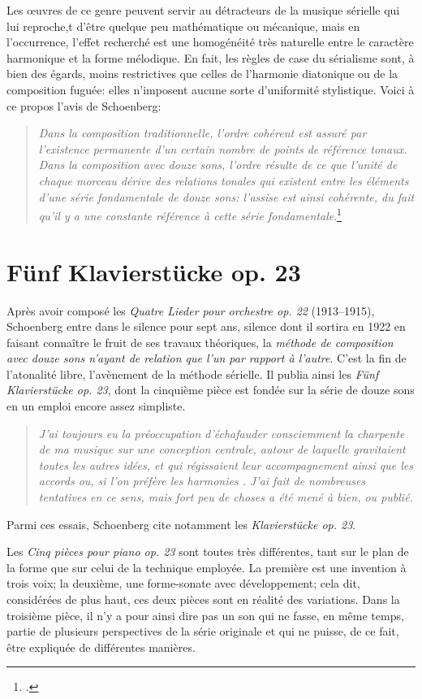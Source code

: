 \documentclass[11pt,a4paper]{scrreprt}
\begin{document}
Les \oe{}uvres de ce genre peuvent servir au détracteurs de la musique sérielle qui lui reproche,t d'être quelque peu mathématique ou mécanique, mais en l'occurrence, l'effet recherché est une homogénéité très naturelle entre le caractère harmonique et la forme mélodique. En fait, les règles de case du sérialisme sont, à bien des égards, moins restrictives que celles de l'harmonie diatonique ou de la composition fuguée: elles n'imposent aucune sorte d'uniformité stylistique. Voici à ce propos l'avis de Schoenberg:
\begin{quote}
\emph{Dans la composition traditionnelle, l'ordre cohérent est assuré par l'existence permanente d'un certain nombre de points de référence tonaux. Dans la composition avec douze sons, l'ordre résulte de ce que l'unité de chaque morceau dérive des relations tonales qui existent entre les éléments d'une série fondamentale de douze sons: l'assise est ainsi cohérente, du fait qu'il y a une constante référence à cette série fondamentale}.\footcite{schoenberg1971}
\end{quote}

\chapter{Fünf Klavierstücke op. 23}
Après avoir composé les \emph{Quatre Lieder pour orchestre op. 22} (1913--1915), Schoenberg entre dans le silence pour sept ans, silence dont il sortira en 1922 en faisant connaître le fruit de ses travaux théoriques, la \emph{méthode de composition avec douze sons n'ayant de relation que l'un par rapport à l'autre}. C'est la fin de l'atonalité libre, l'avènement de la méthode sérielle. Il publia ainsi les \emph{Fünf Klavierstücke op. 23}, dont la cinquième pièce est fondée sur la série de douze sons en un emploi encore assez simpliste.
\begin{quote}
\emph{J'ai toujours eu la préoccupation d'échafauder \emph{consciemment} la charpente de ma musique sur une conception centrale, autour de laquelle gravitaient toutes les autres idées, et qui régissaient leur accompagnement ainsi que les accords ou, si l'on préfère les \og{} harmonies \fg{}. J'ai fait de nombreuses tentatives en ce sens, mais fort peu de choses a été mené à bien, ou publié.}
\end{quote}
Parmi ces essais, Schoenberg cite notamment les \emph{Klavierstücke op. 23}.

Les \emph{Cinq pièces pour piano op. 23} sont toutes très différentes, tant sur le plan de la forme que sur celui de la technique employée. La première est une invention à trois voix; la deuxième, une forme-sonate avec développement; cela dit, considérées de plus haut, ces deux pièces sont en réalité des variations. Dans la troisième pièce, il n'y a pour ainsi dire pas un son qui ne fasse, en même temps, partie de plusieurs perspectives de la série originale et qui ne puisse, de ce fait, être expliquée de différentes manières.
\end{document}
